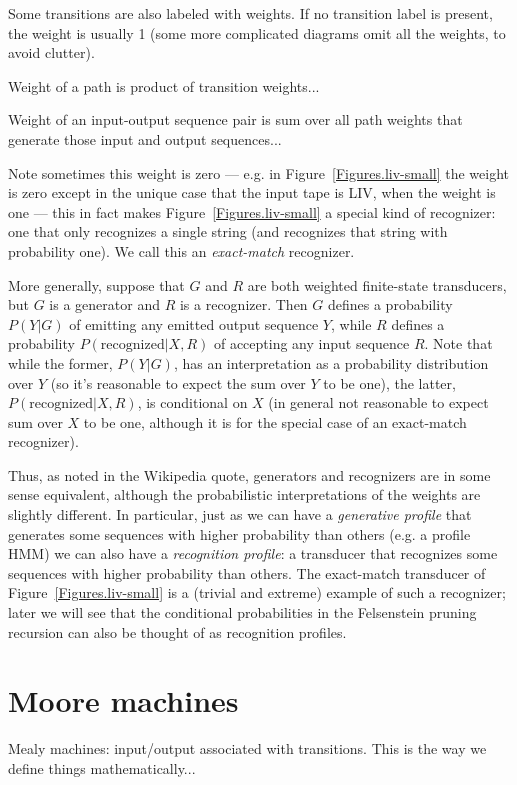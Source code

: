 \documentclass{article}
\newcommand{\figref}[1]{Figure~\ref{Figures.#1}}
\begin{document}
Some transitions are also labeled with weights.
If no transition label is present, the weight is usually 1
(some more complicated diagrams omit all the weights, to avoid clutter).

Weight of a path is product of transition weights...

Weight of an input-output sequence pair is sum over all path weights that generate those input and output sequences...

Note sometimes this weight is zero --- e.g. in \figref{liv-small} the weight is zero
except in the unique case that the input tape is LIV, when the weight is one ---
this in fact makes \figref{liv-small} a special kind of recognizer:
one that only recognizes a single string
(and recognizes that string with probability one).
We call this an {\em exact-match} recognizer.

More generally, suppose that $G$ and $R$ are both weighted finite-state transducers,
but $G$ is a generator and $R$ is a recognizer.
Then $G$ defines a probability $P(Y|G)$ of emitting any emitted output sequence $Y$,
while $R$ defines a probability $P(\mbox{recognized}|X,R)$ of accepting any input sequence $R$.
Note that while the former, $P(Y|G)$, has an interpretation as a probability distribution over $Y$
(so it's reasonable to expect the sum over $Y$ to be one),
the latter, $P(\mbox{recognized}|X,R)$, is conditional on $X$
(in general not reasonable to expect sum over $X$ to be one,
although it is for the special case of an exact-match recognizer).

Thus, as noted in the Wikipedia quote, generators and recognizers are in some sense equivalent,
although the probabilistic interpretations of the weights are slightly different.
In particular, just as we can have a {\em generative profile}
that generates some sequences with higher probability than others (e.g. a profile HMM)
we can also have a {\em recognition profile}: a transducer
that recognizes some sequences with higher probability than others.
The exact-match transducer of \figref{liv-small} is a (trivial and extreme) example of such a recognizer;
later we will see that the conditional probabilities in the Felsenstein pruning recursion can also
be thought of as recognition profiles.

\section{Moore machines}

Mealy machines: input/output associated with transitions.
This is the way we define things mathematically...
\end{document}

